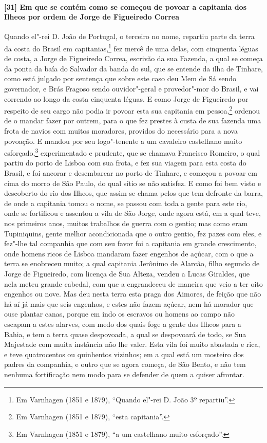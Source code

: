 \paragraph{[31] Em que se contém como se começou de povoar a capitania dos Ilheos por ordem
de Jorge de Figueiredo Correa} \quad
Quando el"-rei D. João de Portugal, o terceiro no nome, repartiu parte da terra da costa do
Brasil em capitanias,\footnote{ Em Varnhagen (1851 e 1879), ``Quando el"-rei D. João 3º
repartiu''.} fez mercê de uma delas, com cinquenta léguas de costa, a Jorge de Figueiredo
Correa, escrivão da sua Fazenda, a qual se começa da ponta da baía do Salvador da banda do
sul, que se entende da ilha de Tinhare, como está julgado por sentença que sobre este caso
deu Mem de Sá sendo governador, e Brás Fragoso sendo ouvidor"-geral e provedor"-mor do
Brasil, e vai correndo ao longo da costa cinquenta léguas. E como Jorge de Figueiredo por
respeito de seu cargo não podia ir povoar esta sua capitania em pessoa,\footnote{ Em
Varnhagen (1851 e 1879), ``esta capitania''.} ordenou de o mandar fazer por outrem, para o
que fez prestes à custa de sua fazenda uma frota de navios com muitos moradores, providos
do necessário para a nova povoação. E mandou por seu logo"-tenente a um cavaleiro
castelhano muito esforçado,\footnote{ Em Varnhagen (1851 e 1879), ``a um castelhano muito
esforçado''.} experimentado e prudente, que se chamava Francisco Romeiro, o qual partiu do
porto de Lisboa com sua frota, e fez sua viagem para esta costa do Brasil, e foi ancorar e
desembarcar no porto de Tinhare, e começou a povoar em cima do morro de São Paulo, do qual
sítio se não satisfez. E como foi bem visto e descoberto do rio dos Ilheos, que assim se
chama pelos que tem defronte da barra, de onde a capitania tomou o nome, se passou com
toda a gente para este rio, onde se fortificou e assentou a vila de São Jorge, onde agora
está, em a qual teve, nos primeiros anos, muitos trabalhos de guerra com o gentio; mas
como eram Tupiniquins, gente melhor acondicionada que o outro gentio, fez pazes com eles,
e fez"-lhe tal companhia que com seu favor foi a capitania em grande crescimento, onde
homens ricos de Lisboa mandaram fazer engenhos de açúcar, com o que a terra se enobreceu
muito; a qual capitania Jerônimo de Alarcão, filho segundo de Jorge de Figueiredo, com
licença de Sua Alteza, vendeu a Lucas Giraldes, que nela meteu grande cabedal, com que a
engrandeceu de maneira que veio a ter oito engenhos ou nove. Mas deu nesta terra esta
praga dos Aimores, de feição que não há aí já mais que seis engenhos, e estes não fazem
açúcar, nem há morador que ouse plantar canas, porque em indo os escravos ou homens ao
campo não escapam a estes alarves, com medo dos quais foge a gente dos Ilheos para a
Bahia, e tem a terra quase despovoada, a qual se despovoará de todo, se Sua Majestade com
muita instância não lhe valer. Esta vila foi muito abastada e rica, e teve quatrocentos ou
quinhentos vizinhos; em a qual está um mosteiro dos padres da companhia, e outro que se
agora começa, de São Bento, e não tem nenhuma fortificação nem modo para se defender de
quem a quiser afrontar.

